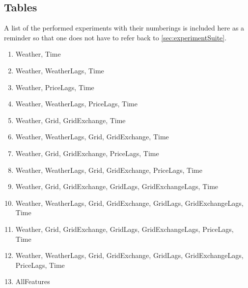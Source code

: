\onecolumn
\subsection{Tables}\label{app:C}
A list of the performed experiments with their numberings is included here as a 
reminder so that one does not have to refer back to 
\autoref{sec:experimentSuite}.
\begin{enumerate}
	\item Weather, Time
	\item Weather, WeatherLags, Time
	\item Weather, PriceLags, Time
	\item Weather, WeatherLags, PriceLags, Time
	\item Weather, Grid, GridExchange, Time
	\item Weather, WeatherLags, Grid, 
	GridExchange, Time
	\item Weather, Grid, GridExchange, PriceLags, 
	Time
	\item Weather, WeatherLags, Grid, 
	GridExchange, PriceLags, Time
	\item Weather, Grid, GridExchange, GridLags, 
	GridExchangeLags, Time
	\item Weather, WeatherLags, Grid, 
	GridExchange, GridLags,	GridExchangeLags, 
	Time
	\item Weather, Grid, GridExchange, GridLags, 
	GridExchangeLags, PriceLags, Time
	\item Weather, WeatherLags, Grid, 
	GridExchange, GridLags, GridExchangeLags, 
	PriceLags, Time
	\item AllFeatures
\end{enumerate}




\begin{landscape}
	
	
\end{landscape}





